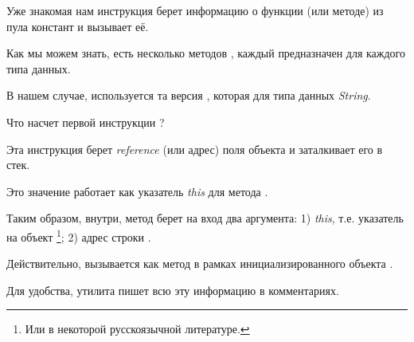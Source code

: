 Уже знакомая нам инструкция  берет информацию о функции (или методе)  
из пула констант и вызывает её.

Как мы можем знать, есть несколько методов , каждый предназначен для каждого типа
данных.

В нашем случае, используется та версия , которая для типа данных \emph{String}.


Что насчет первой инструкции ?

Эта инструкция берет \emph{reference} (или адрес) поля объекта 
и заталкивает его в стек.

Это значение работает как указатель \emph{this} для метода .

Таким образом, внутри, метод  берет на вход два аргумента:
1) \emph{this}, т.е. указатель на объект
\footnote{Или  в некоторой русскоязычной литературе.};
2) адрес строки .


Действительно,  вызывается как метод в рамках инициализированного объекта 
.


Для удобства, утилита  пишет всю эту информацию в комментариях.
